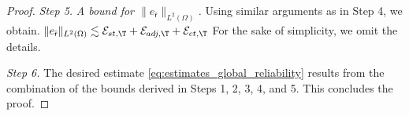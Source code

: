 \documentclass[final]{siamart0216}
\begin{document}
\begin{proof}
\emph{Step 5.} \emph{A bound for $\|e_{\bar{\mathsf{r}}}\|_{L^2(\Omega)}$.} Using similar arguments as in Step 4, we obtain.
$
\|e_{\bar{\mathsf{r}}}\|_{L^2(\Omega)}\lesssim \mathcal{E}_{st,\T}+\mathcal{E}_{adj,\T}+\mathcal{E}_{ct,\T}
$
For the sake of simplicity, we omit the details.

\emph{Step 6.} The desired estimate \eqref{eq:estimates_global_reliability} results from the combination of the bounds derived in Steps 1, 2, 3, 4, and 5. This concludes the proof.
\end{proof}

\end{document}
